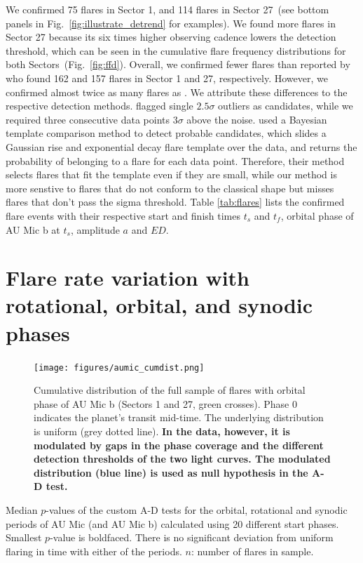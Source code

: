 \documentclass[fleqn,usenatbib]{mnras}%
\begin{document}
We confirmed 75 flares in Sector 1, and 114 flares in Sector 27~(see bottom panels in Fig.~\ref{fig:illustrate_detrend} for examples). We found more flares in Sector 27 because its six times higher observing cadence lowers the detection threshold, which can be seen in the cumulative flare frequency distributions for both Sectors~(Fig.~\ref{fig:ffd}). Overall, we confirmed fewer flares than reported by \citet{martioli2021new} who found 162 and 157 flares in Sector 1 and 27, respectively. However, we confirmed almost twice as many flares as \citet{gilbert2021flares}. We attribute these differences to the respective detection methods. \citet{martioli2021new} flagged single $2.5\sigma$ outliers as candidates, while we required three consecutive data points $3\sigma$ above the noise. \citet{gilbert2021flares} used a Bayesian template comparison method to detect probable candidates, which slides a Gaussian rise and exponential decay flare template over the data, and returns the probability of belonging to a flare for each data point. Therefore, their method selects flares that fit the template even if they are small, while our method is more senstive to flares that do not conform to the classical shape but misses flares that don't pass the sigma threshold. Table \ref{tab:flares} lists the confirmed flare events with their respective start and finish times $t_s$ and $t_f$, orbital phase of AU Mic b at $t_s$, amplitude $a$ and $ED$.

\section{Flare rate variation with rotational, orbital, and synodic phases}
\label{sec:phases}


\begin{figure}
\texttt{[image: figures/aumic\_cumdist.png]} 
\caption{Cumulative distribution of the full sample of flares with orbital phase of AU Mic b (Sectors 1 and 27, green crosses). Phase 0 indicates the planet's transit mid-time. The underlying distribution is uniform (grey dotted line). \textbf{In the data, however, it is modulated by gaps in the phase coverage and the different detection thresholds of the two light curves. The modulated distribution (blue line) is used as null hypothesis in the A-D test.}}
\label{fig:cumdist}
\end{figure}

\begin{table}
\caption{Median $p$-values of the custom A-D tests for the orbital, rotational and synodic periods of AU Mic (and AU Mic b) calculated using 20 different start phases. Smallest $p$-value is boldfaced. There is no significant deviation from uniform flaring in time with either of the periods. $n$: number of flares in sample.}
\centering

\label{tab:pvals}
\end{table}
\end{document}
